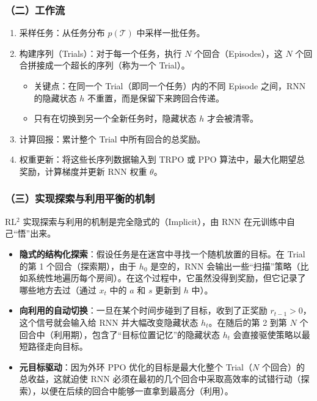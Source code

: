 \hypertarget{ux4e8cux5de5ux4f5cux6d41-2}{%
\subsubsection{（二）工作流}\label{ux4e8cux5de5ux4f5cux6d41-2}}

\begin{enumerate}
\def\labelenumi{\arabic{enumi}.}
\tightlist
\item
  采样任务：从任务分布 \(p(\mathcal{T})\) 中采样一批任务。
\item
  构建序列（Trials）：对于每一个任务，执行 \(N\) 个回合（Episodes），这 \(N\) 个回合拼接成一个超长的序列（称为一个 Trial）。

  \begin{itemize}
  \tightlist
  \item
    关键点：在同一个 Trial（即同一个任务）内的不同 Episode 之间，RNN 的隐藏状态 \(h\) 不重置，而是保留下来跨回合传递。
  \item
    只有在切换到另一个全新任务时，隐藏状态 \(h\) 才会被清零。
  \end{itemize}
\item
  计算回报：累计整个 Trial 中所有回合的总奖励。
\item
  权重更新：将这些长序列数据输入到 TRPO 或 PPO 算法中，最大化期望总奖励，计算梯度并更新 RNN 权重 \(\theta\)。
\end{enumerate}

\hypertarget{ux4e09ux5b9eux73b0ux63a2ux7d22ux4e0eux5229ux7528ux5e73ux8861ux7684ux673aux5236}{%
\subsubsection{（三）实现探索与利用平衡的机制}\label{ux4e09ux5b9eux73b0ux63a2ux7d22ux4e0eux5229ux7528ux5e73ux8861ux7684ux673aux5236}}

RL\(^2\) 实现探索与利用的机制是完全隐式的（Implicit），由 RNN 在元训练中自己``悟''出来。

\begin{itemize}
\tightlist
\item
  \textbf{隐式的结构化探索}：假设任务是在迷宫中寻找一个随机放置的目标。在 Trial 的第 1 个回合（探索期），由于 \(h_0\) 是空的，RNN 会输出一些``扫描''策略（比如系统性地遍历每个房间）。在这个过程中，它虽然没得到奖励，但它记录了哪些地方去过（通过 \(x_t\) 中的 \(a\) 和 \(s\) 更新到 \(h\) 中）。
\item
  \textbf{向利用的自动切换}：一旦在某个时间步碰到了目标，收到了正奖励 \(r_{t-1}>0\)，这个信号就会输入给 RNN 并大幅改变隐藏状态 \(h_t\)。在随后的第 2 到第 \(N\) 个回合中（利用期），包含了``目标位置记忆''的隐藏状态 \(h_t\) 会直接驱使策略以最短路径走向目标。
\item
  \textbf{元目标驱动}：因为外环 PPO 优化的目标是最大化整个 Trial（\(N\) 个回合）的总收益，这就迫使 RNN 必须在最初的几个回合中采取高效率的试错行动（探索），以便在后续的回合中能够一直拿到最高分（利用）。
\end{itemize}

